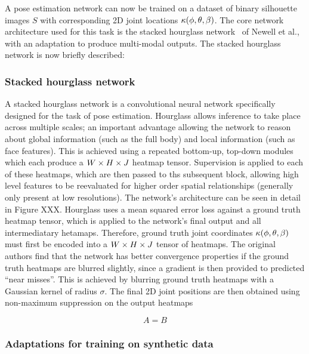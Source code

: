 A pose estimation network can now be trained on a dataset of binary silhouette images $S$ with corresponding 2D joint locations $\kappa(\phi,\theta,\beta)$. The core network architecture used for this task is the stacked hourglass network~\cite{newell2016stacked} of Newell et al., with an adaptation to produce multi-modal outputs. The stacked hourglass network is now briefly described:

\subsubsection{Stacked hourglass network}

A stacked hourglass network is a convolutional neural network specifically designed for the task of pose estimation. Hourglass allows inference to take place across multiple scales; an important advantage allowing the network to reason about global information (such as the full body) and local information (such as face features). This is achieved using a repeated bottom-up, top-down modules which each produce a $W \times H \times J$ heatmap tensor. Supervision is applied to each of these heatmaps, which are then passed to ths subsequent block, allowing high level features to be reevaluated for higher order spatial relationships (generally only present at low resolutions). The network's architecture can be seen in detail in Figure XXX. Hourglass uses a mean squared error loss against a ground truth heatmap tensor, which is applied to the network's final output and all intermediatary hetamaps. Therefore, ground truth joint coordinates $\kappa(\phi,\theta,\beta)$ must first be encoded into a $W \times H \times J$ tensor of heatmaps. The original authors find that the network has better convergence properties if the ground truth heatmaps are blurred slightly, since a gradient is then provided to predicted ``near misses''. This is achieved by blurring ground truth heatmaps with a Gaussian kernel of radius $\sigma$. The final 2D joint positions are then obtained using non-maximum suppression on the output heatmaps

\begin{equation}\label{eq:non-max-suppression}
    A = B    
\end{equation}

\subsubsection{Adaptations for training on synthetic data}


